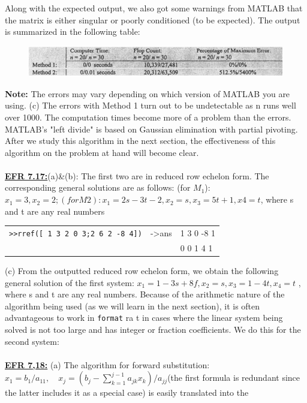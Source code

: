 \documentclass[../main.tex]{subfiles}
\begin{document}
Along with the expected output, we also got some warnings from MATLAB that the matrix is either 
singular or poorly conditioned (to be expected). The output is summarized in the following table: 
\begin{figure}[H]
    \centering
    \includegraphics[width=1\linewidth]{46}
    \label{pfig:ch13_46}
\end{figure}
\textbf{Note:} The errors may vary depending on which version of MATLAB you are using. 
(c) The errors with Method 1 turn out to be undetectable as n runs well over 1000. The computation 
times become more of a problem than the errors. MATLAB's "left divide" is based on Gaussian 
elimination with partial pivoting. After we study this algorithm in the next section, the effectiveness of 
this algorithm on the problem at hand will become clear. 
\\
\\
\textbf{\underline{EFR 7.17:}}(a)\&(b): The first two are in reduced row echelon form. The corresponding general 
solutions are as follows: (for $M_1$): $x_1=3, x_2 = 2; (for M2 ): x_1=2s-3t-2, x_2=s, x_3=5t+1, 
x4=t$, where s and t are any real numbers
\begin{center}
\begin{tabular}{|l|l|l|}
\hline
\texttt{>>rref([ 1  3  2  0  3;2  6  2 -8  4])}&->ans&1  3  0 -8  1\\
&&0  0  1  4 1 \\
\hline
\end{tabular}
\end{center}
(c) From the outputted reduced row echelon form, we obtain the following general solution of the first 
system: $x_1 = 1 - 3s + 8f, x_2 = s, x_3 = 1 - 4t, x_4 = t$ , where s and t are any real numbers. Because of 
the arithmetic nature of the algorithm being used (as we will learn in the next section), it is often 
advantageous to work in \texttt{format} ra t in cases where the linear system being solved is not too large 
and has integer or fraction coefficients. We do this for the second system:
\\
\\
\textbf{\underline{EFR 7,18:}} (a) The algorithm for forward substitution:$x_{1}=b_{1} / a_{11}, \quad x_{j}=\left(b_{j}-\sum_{k=1}^{j-1} a_{j k} x_{k}\right) / a_{jj}$(the first formula is redundant since the latter includes it as a special case) is easily translated into the 
\end{document}

